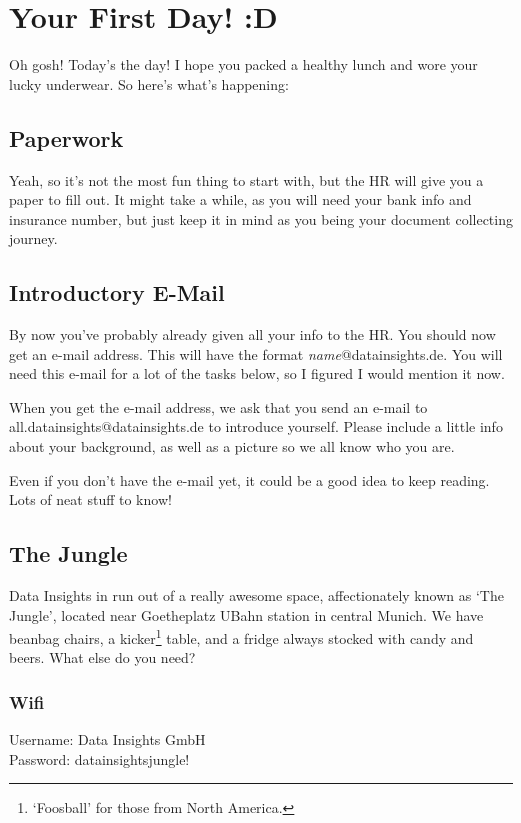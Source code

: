 \documentclass[11pt]{report}
\begin{document}
\chapter{Your First Day! :D}

Oh gosh! Today's the day! I hope you packed a healthy lunch and wore your lucky underwear. So here's what's happening:

\section{Paperwork}
\label{paperwork}
Yeah, so it's not the most fun thing to start with, but the HR will give you a paper to fill out. It might take a while, as you will need your bank info and insurance number, but just keep it in mind as you being your document collecting journey.

\section{Introductory E-Mail}
\label{Email}
By now you've probably already given all your info to the HR. You should now get an e-mail address. This will have the format \emph{name}@datainsights.de. You will need this e-mail for a lot of the tasks below, so I figured I would mention it now. 

When you get the e-mail address, we ask that you send an e-mail to all.datainsights@datainsights.de to introduce yourself. Please include a little info about your background, as well as a picture so we all know who you are.

Even if you don't have the e-mail yet, it could be a good idea to keep reading. Lots of neat stuff to know!

\section{The Jungle}
Data Insights in run out of a really awesome space, affectionately known as `The Jungle', located near Goetheplatz UBahn station in central Munich. We have beanbag chairs, a kicker\footnote{`Foosball' for those from North America.} table, and a fridge always stocked with candy and beers. What else do you need?
\subsection{Wifi}
\label{wifi}
Username: Data Insights GmbH\\
Password: datainsightsjungle!
\end{document}
